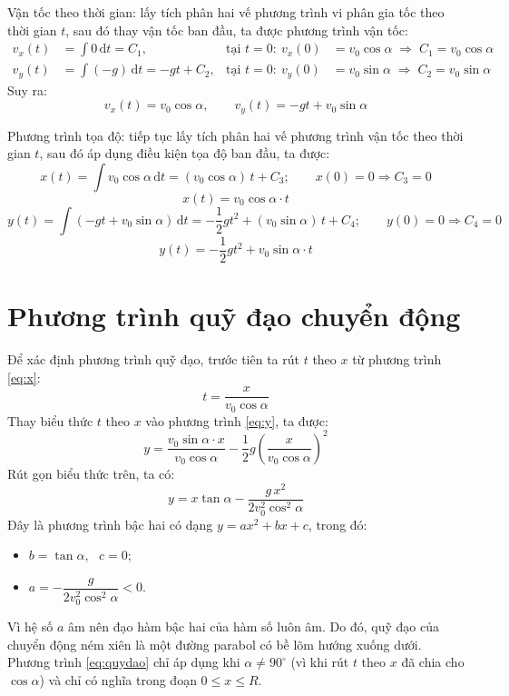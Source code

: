 Vận tốc theo thời gian: lấy tích phân hai vế phương trình vi phân gia tốc theo thời gian $t$, sau đó thay vận tốc ban đầu, ta được phương trình vận tốc:
\begin{align*}
  v_x(t) &= \int 0\,\mathrm{d}t = C_1,
    & \text{tại } t = 0:\ v_x(0) &= v_0\cos\alpha \;\Rightarrow\; C_1 = v_0\cos\alpha \\
  v_y(t) &= \int (-g)\,\mathrm{d}t = -gt + C_2,
    & \text{tại } t = 0:\ v_y(0) &= v_0\sin\alpha \;\Rightarrow\; C_2 = v_0\sin\alpha
\end{align*}
Suy ra:
\[ v_x(t) = v_0\cos\alpha, \qquad v_y(t) = -gt + v_0\sin\alpha \]

Phương trình tọa độ: tiếp tục lấy tích phân hai vế phương trình vận tốc theo thời gian $t$, sau đó áp dụng điều kiện tọa độ ban đầu, ta được:
\[ x(t) = \int v_0\cos\alpha\,\mathrm{d}t = (v_0\cos\alpha)\,t + C_3; \qquad x(0) = 0 \Rightarrow C_3 = 0 \]
\begin{equation}
  x(t) = v_0\cos\alpha\cdot t
  \label{eq:x}
\end{equation}
\[ y(t) = \int (-gt + v_0\sin\alpha)\,\mathrm{d}t = -\frac{1}{2}gt^2 + (v_0\sin\alpha)\,t + C_4; \qquad y(0) = 0 \Rightarrow C_4 = 0 \]
\begin{equation}
  y(t) = -\frac{1}{2}gt^2 + v_0\sin\alpha\cdot t
  \label{eq:y}
\end{equation}

\section{Phương trình quỹ đạo chuyển động}
Để xác định phương trình quỹ đạo, trước tiên ta rút $t$ theo $x$ từ phương trình \eqref{eq:x}:
\[ t = \frac{x}{v_0\cos\alpha} \]
Thay biểu thức $t$ theo $x$ vào phương trình \eqref{eq:y}, ta được:
\[ y = \frac{v_0\sin\alpha\cdot x}{v_0\cos\alpha} - \frac{1}{2}g\left(\frac{x}{v_0\cos\alpha}\right)^2 \]
Rút gọn biểu thức trên, ta có:
\begin{equation}
  y = x\tan\alpha - \frac{g\,x^2}{2v_0^2\cos^2\alpha}
  \label{eq:quydao}
\end{equation}
Đây là phương trình bậc hai có dạng $y = ax^2 + bx + c$, trong đó:
\begin{itemize}
  \item $b = \tan\alpha$, \ $c = 0$;
  \item $a = -\dfrac{g}{2v_0^2\cos^2\alpha} < 0$.
\end{itemize}
Vì hệ số $a$ âm nên đạo hàm bậc hai của hàm số luôn âm. Do đó, quỹ đạo của chuyển động ném xiên là một đường parabol có bề lõm hướng xuống dưới. Phương trình \eqref{eq:quydao} chỉ áp dụng khi $\alpha \neq 90^\circ$ (vì khi rút $t$ theo $x$ đã chia cho $\cos\alpha$) và chỉ có nghĩa trong đoạn $0 \le x \le R$.


